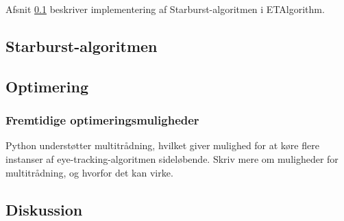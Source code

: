 \documentclass[rapport.tex]{subfiles}
\begin{document}
	
	
	Afsnit \ref{StarburstImpl} beskriver implementering af Starburst-algoritmen i ETAlgorithm.
	\subsection{Starburst-algoritmen}
	\label{StarburstImpl}
	\subsection{Optimering}
	
	\subsubsection{Fremtidige optimeringsmuligheder}
	Python understøtter multitrådning, hvilket giver mulighed for at køre flere instanser af eye-tracking-algoritmen sideløbende. Skriv mere om muligheder for multitrådning, og hvorfor det kan virke.
	\subsection{Diskussion}
		
\end{document}
